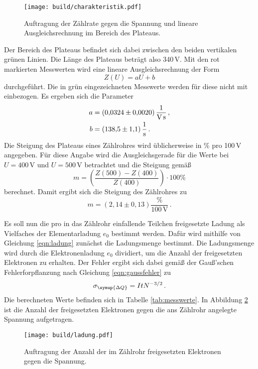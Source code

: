 \begin{figure}
  \centering
  \texttt{[image: build/charakteristik.pdf]}
  \caption{Auftragung der Zählrate gegen die Spannung und lineare Ausgleichsrechnung
  im Bereich des Plateaus.}
  \label{fig:plateau}
\end{figure}

Der Bereich des Plateaus befindet sich dabei zwischen den
beiden vertikalen grünen Linien. Die Länge des Plateaus beträgt also 340\,V.
Mit den rot markierten Messwerten wird eine lineare
Ausgleichsrechnung der Form
\begin{equation}
  Z(U)=aU+b
\end{equation}
durchgeführt. Die in grün eingezeichneten Messwerte werden für diese nicht mit
einbezogen. Es ergeben sich die Parameter
\begin{align*}
  a &= (0{,}0324 \pm 0{,}0020)\, \frac{1}{\text{V\,s}} \,,\\
  b &= (138{,}5 \pm 1{,}1)\,\frac{1}{\text{s}} \,.
\end{align*}
Die Steigung des Plateaus eines Zählrohres wird üblicherweise in $\%$ pro 100\,V
angegeben. Für diese Angabe wird die Ausgleichsgerade für die Werte bei $U=400\,$V
und $U=500\,$V betrachtet und die Steigung gemäß
\begin{equation*}
	m=\left(\frac{Z(500)-Z(400)}{Z(400)}\right)\cdot 100\%
\end{equation*}
berechnet. Damit ergibt sich die Steigung des Zählrohres zu
\begin{equation*}
	m=(2{,}14 \pm 0{,}13)\frac{\%}{100\, \text{V}}\,.
\end{equation*}

Es soll nun die pro in das Zählrohr einfallende Teilchen freigesetzte Ladung
als Vielfaches der Elementarladung $e_0$ bestimmt werden. Dafür wird mithilfe von
Gleichung \eqref{eqn:ladung} zunächst die Ladungsmenge bestimmt. Die Ladungsmenge wird durch die
Elektronenladung $e_0$ dividiert, um die Anzahl der freigesetzten Elektronen
zu erhalten. Der Fehler ergibt sich dabei
gemäß der Gauß'schen Fehlerforpflanzung nach Gleichung \eqref{eqn:gaussfehler} zu
\begin{equation*}
  \sigma_{\symup{\Delta Q}} =  I t N^{-3/2}\,.
\end{equation*}
Die berechneten Werte befinden sich in Tabelle \ref{tab:messwerte}.
In Abbildung \ref{fig:ladung} ist die Anzahl der freigesetzten Elektronen
gegen die ans Zählrohr angelegte Spannung aufgetragen.

\begin{figure}
  \centering
  \texttt{[image: build/ladung.pdf]}
  \caption{Auftragung der Anzahl der im Zählrohr freigesetzten Elektronen gegen die Spannung.}
  \label{fig:ladung}
\end{figure}

